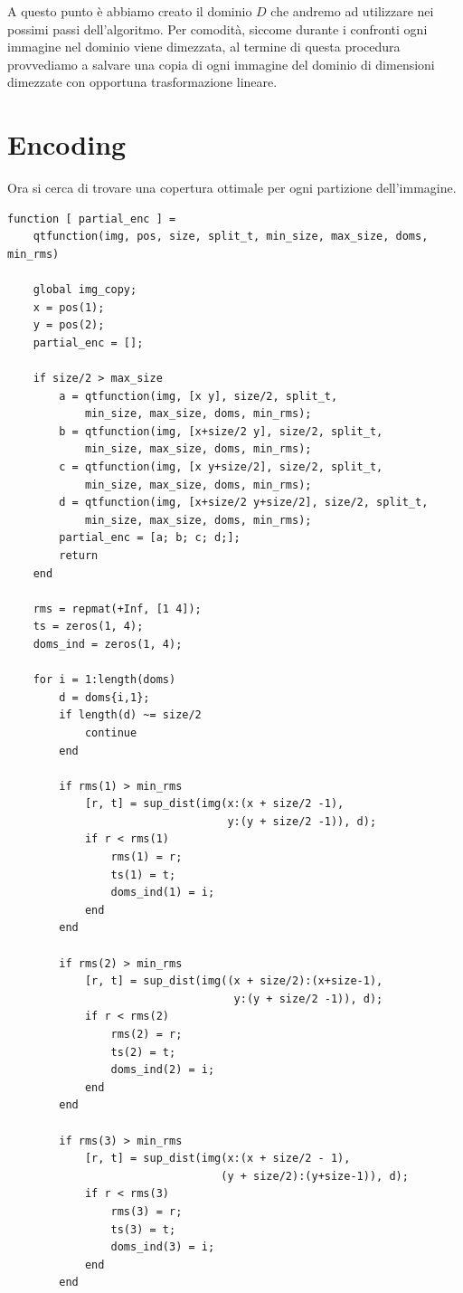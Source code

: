 \documentclass[11pt,a4paper,appendixprefix=true,numbers=noenddot]{scrreprt}
\begin{document}
A questo punto è abbiamo creato il dominio $D$ che andremo ad utilizzare nei possimi passi dell'algoritmo. Per comodità, siccome durante i confronti ogni immagine nel dominio viene dimezzata, al termine di questa procedura provvediamo a salvare una copia di ogni immagine del dominio di dimensioni dimezzate con opportuna trasformazione lineare.

\section{Encoding}

Ora si cerca di trovare una copertura ottimale per ogni partizione dell'immagine.

\begin{verbatim}
function [ partial_enc ] = 
    qtfunction(img, pos, size, split_t, min_size, max_size, doms, min_rms)

    global img_copy;
    x = pos(1);
    y = pos(2);
    partial_enc = [];

    if size/2 > max_size
        a = qtfunction(img, [x y], size/2, split_t, 
            min_size, max_size, doms, min_rms);
        b = qtfunction(img, [x+size/2 y], size/2, split_t, 
            min_size, max_size, doms, min_rms);
        c = qtfunction(img, [x y+size/2], size/2, split_t, 
            min_size, max_size, doms, min_rms);
        d = qtfunction(img, [x+size/2 y+size/2], size/2, split_t, 
            min_size, max_size, doms, min_rms);
        partial_enc = [a; b; c; d;];
        return
    end

    rms = repmat(+Inf, [1 4]);
    ts = zeros(1, 4);
    doms_ind = zeros(1, 4);

    for i = 1:length(doms)
        d = doms{i,1};
        if length(d) ~= size/2
            continue
        end
        
        if rms(1) > min_rms
            [r, t] = sup_dist(img(x:(x + size/2 -1), 
                                  y:(y + size/2 -1)), d);
            if r < rms(1)
                rms(1) = r;
                ts(1) = t;
                doms_ind(1) = i;
            end
        end
        
        if rms(2) > min_rms
            [r, t] = sup_dist(img((x + size/2):(x+size-1), 
                                   y:(y + size/2 -1)), d);
            if r < rms(2)
                rms(2) = r;
                ts(2) = t;
                doms_ind(2) = i;
            end
        end
        
        if rms(3) > min_rms
            [r, t] = sup_dist(img(x:(x + size/2 - 1), 
                                 (y + size/2):(y+size-1)), d);
            if r < rms(3)
                rms(3) = r;
                ts(3) = t;
                doms_ind(3) = i;
            end
        end
        

\end{verbatim}
\end{document}
